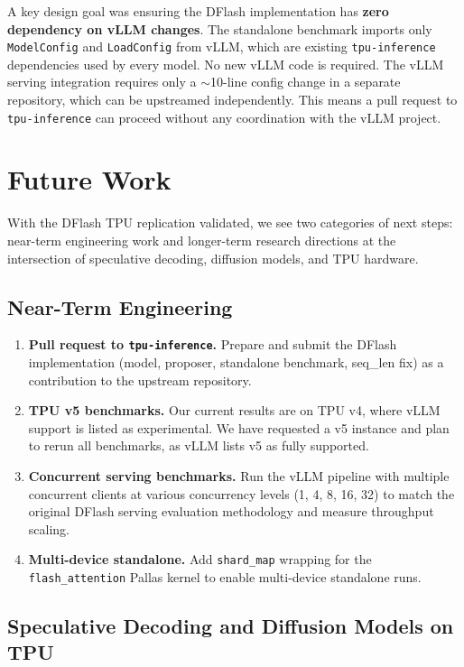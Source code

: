 \documentclass[12pt,letterpaper]{article}
\begin{document}
A key design goal was ensuring the DFlash implementation has \textbf{zero dependency on vLLM changes}. The standalone benchmark imports only \texttt{ModelConfig} and \texttt{LoadConfig} from vLLM, which are existing \texttt{tpu-inference} dependencies used by every model. No new vLLM code is required. The vLLM serving integration requires only a $\sim$10-line config change in a separate repository, which can be upstreamed independently. This means a pull request to \texttt{tpu-inference} can proceed without any coordination with the vLLM project.


\section{Future Work}

With the DFlash TPU replication validated, we see two categories of next steps: near-term engineering work and longer-term research directions at the intersection of speculative decoding, diffusion models, and TPU hardware.

\subsection{Near-Term Engineering}

\begin{enumerate}
    \item \textbf{Pull request to \texttt{tpu-inference}.} Prepare and submit the DFlash implementation (model, proposer, standalone benchmark, seq\_len fix) as a contribution to the upstream repository.
    \item \textbf{TPU v5 benchmarks.} Our current results are on TPU v4, where vLLM support is listed as experimental. We have requested a v5 instance and plan to rerun all benchmarks, as vLLM lists v5 as fully supported.
    \item \textbf{Concurrent serving benchmarks.} Run the vLLM pipeline with multiple concurrent clients at various concurrency levels (1, 4, 8, 16, 32) to match the original DFlash serving evaluation methodology and measure throughput scaling.
    \item \textbf{Multi-device standalone.} Add \texttt{shard\_map} wrapping for the \texttt{flash\_attention} Pallas kernel to enable multi-device standalone runs.
\end{enumerate}

\subsection{Speculative Decoding and Diffusion Models on TPU}
\end{document}

